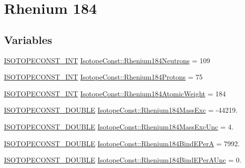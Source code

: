 \hypertarget{group___isotope_const-_rhenium-_re184}{}\section{Rhenium 184}
\label{group___isotope_const-_rhenium-_re184}
\subsection*{Variables}
\begin{DoxyCompactItemize}
\item 
\mbox{\hyperlink{group___isotope_const-_macros_ga5f18360b3e99483a35c32d789e62621c}{I\+S\+O\+T\+O\+P\+E\+C\+O\+N\+S\+T\+\_\+\+I\+NT}} \mbox{\hyperlink{group___isotope_const-_rhenium-_re184_ga44e5f9c2bb31f12c5399765646eb90a8}{Isotope\+Const\+::\+Rhenium184\+Neutrons}} = 109
\item 
\mbox{\hyperlink{group___isotope_const-_macros_ga5f18360b3e99483a35c32d789e62621c}{I\+S\+O\+T\+O\+P\+E\+C\+O\+N\+S\+T\+\_\+\+I\+NT}} \mbox{\hyperlink{group___isotope_const-_rhenium-_re184_ga873e3cf8555e69662597c227d235983d}{Isotope\+Const\+::\+Rhenium184\+Protons}} = 75
\item 
\mbox{\hyperlink{group___isotope_const-_macros_ga5f18360b3e99483a35c32d789e62621c}{I\+S\+O\+T\+O\+P\+E\+C\+O\+N\+S\+T\+\_\+\+I\+NT}} \mbox{\hyperlink{group___isotope_const-_rhenium-_re184_ga5d5ddc5e0d424d878ea7a5187b9ca8a6}{Isotope\+Const\+::\+Rhenium184\+Atomic\+Weight}} = 184
\item 
\mbox{\hyperlink{group___isotope_const-_macros_ga8f45a7272ce02c0b4c65c44636ed719a}{I\+S\+O\+T\+O\+P\+E\+C\+O\+N\+S\+T\+\_\+\+D\+O\+U\+B\+LE}} \mbox{\hyperlink{group___isotope_const-_rhenium-_re184_ga8baf0e5944c430e2905053bf2846f20c}{Isotope\+Const\+::\+Rhenium184\+Mass\+Exc}} = -\/44219.
\item 
\mbox{\hyperlink{group___isotope_const-_macros_ga8f45a7272ce02c0b4c65c44636ed719a}{I\+S\+O\+T\+O\+P\+E\+C\+O\+N\+S\+T\+\_\+\+D\+O\+U\+B\+LE}} \mbox{\hyperlink{group___isotope_const-_rhenium-_re184_gad9b5748efcef1ceaf2283848fce3d7cc}{Isotope\+Const\+::\+Rhenium184\+Mass\+Exc\+Unc}} = 4.
\item 
\mbox{\hyperlink{group___isotope_const-_macros_ga8f45a7272ce02c0b4c65c44636ed719a}{I\+S\+O\+T\+O\+P\+E\+C\+O\+N\+S\+T\+\_\+\+D\+O\+U\+B\+LE}} \mbox{\hyperlink{group___isotope_const-_rhenium-_re184_gacdefe3dbd39eb11bab25d0ddc67eead1}{Isotope\+Const\+::\+Rhenium184\+Bind\+E\+PerA}} = 7992.
\item 
\mbox{\hyperlink{group___isotope_const-_macros_ga8f45a7272ce02c0b4c65c44636ed719a}{I\+S\+O\+T\+O\+P\+E\+C\+O\+N\+S\+T\+\_\+\+D\+O\+U\+B\+LE}} \mbox{\hyperlink{group___isotope_const-_rhenium-_re184_ga8345648b037a75c3dd89edd56851f47b}{Isotope\+Const\+::\+Rhenium184\+Bind\+E\+Per\+A\+Unc}} = 0.

\end{DoxyCompactItemize}
